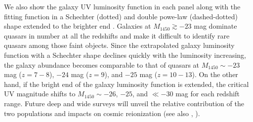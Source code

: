 \documentclass[twocolumn, twocolappendix]{aastex63}
\newcommand{\Muv}{M_{1450}}
\begin{document}
\begin{CJK*}{UTF8}{gbsn}
We also show the galaxy UV luminosity function in each panel
along with the fitting function in a Schechter (dotted) and double powe-law (dashed-dotted) shape extended to the brighter end
\citep{2013MNRAS.432.2696M, 2016ApJ...819..129O, 2018ApJ...867..150M, 2019ApJ...883...99S, 2020MNRAS.493.2059B,
2021AJ....162...47B, 2022arXiv220712356D,
2022ApJS..259...20H, Harikane_2022b, Harikane_2022c, 2022arXiv220709434N}.
Galaxies at $\Muv\gtrsim -23$ mag dominate quasars in number at all the redshifts and make it 
difficult to identify rare quasars among those faint objects.
Since the extrapolated galaxy luminosity function with a Schechter shape declines quickly with the luminosity increasing,
the galaxy abundance becomes comparable to that of quasars at $\Muv \sim -23$ mag ($z=7-8$), $-24$ mag ($z=9$), and $-25$ mag ($z=10-13$).
On the other hand, if the bright end of the galaxy luminosity function is extended, the critical UV magnitude shifts to
$\Muv\sim-26$, $-25$, and $\ll -30$ mag for each redshift range.
Future deep and wide surveys will unveil the relative contribution of the two populations and impacts on cosmic reionization
(see also , \citealt{2022NatAs...6..850J}).




\end{CJK*}
\end{document}
